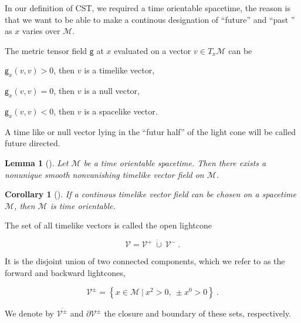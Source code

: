 \documentclass[10pt]{book}
\newcommand{\Mcal}{\mathcal{M}}
\newcommand{\Vcal}{\mathcal{V}}
\newcommand{\gsf}{\mathsf{g}}
\theoremstyle{break}
\newtheorem{lemma}{Lemma}
\newtheorem{corollary}{Corollary}
\begin{document}
In our definition of CST, we required a time orientable spacetime, the reason is that we want to be able to make a continous designation of ``future'' and ``past '' as $x$ varies over $\Mcal$. \par

The metric tensor field $\gsf$ at $x$ evaluated on a vector $v \in T_x\Mcal$ can be
\begin{description}
 \item $\gsf_x(v,v) > 0$, then $v$ is a timelike vector,
 \item $\gsf_x(v,v) = 0$, then $v$ is a null vector,
 \item $\gsf_x(v,v) < 0$, then $v$ is a spacelike vector.
\end{description}
A time like or null vector lying in the ``futur half'' of the light cone will be called future directed.

\begin{lemma}[]
Let $\Mcal$ be a time orientable spacetime. Then there exists a nonunique smooth nonvanishing timelike vector field on $\Mcal$.
\end{lemma}

\begin{corollary}[]
If a continous timelike vector field can be chosen on a spacetime $\Mcal$, then $\Mcal$ is time orientable.
\end{corollary}

The set of all timelike vectors is called the open lightcone 

\begin{equation*}
 \Vcal=\Vcal^{+} \ \dot{\cup} \ \Vcal^{-} \ . 
\end{equation*}

It is the disjoint union of two connected components, which we refer to as the forward and backward lightcones, 

\begin{equation*}
\Vcal^{\pm}=\left\{ x\in\Mcal \ | \ x^{2}>0, \ \pm x^{0}>0 \right\} \ . 
\end{equation*}

We denote by $\overline{\Vcal^{\pm}}$ and $\partial\Vcal^{\pm}$ the closure and boundary of these sets, respectively. \par
\end{document}
